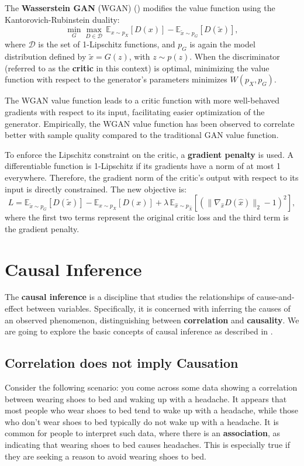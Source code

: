 The \textbf{Wasserstein GAN} (WGAN) (\cite{gulrajani2017}) modifies the value
function using the Kantorovich-Rubinstein duality:
\[
\min_G \max_{D \in \mathcal{D}} \, \mathbb{E}_{x \sim p_X}[D(x)] - \mathbb{E}_{\tilde{x} \sim p_G}[D(\tilde{x})],
\]
where \( \mathcal{D} \) is the set of 1-Lipschitz functions,
and \( p_G \) is again the model distribution defined by \(\tilde{x} = G(z)\),
with \( z \sim p(z) \). When the discriminator (referred to as the \textbf{critic}
in this context) is optimal, minimizing the value function with respect
to the generator's parameters minimizes \( W(p_X, p_G) \).

The WGAN value function leads to a critic function with more well-behaved
gradients with respect to its input, facilitating easier optimization
of the generator. Empirically, the WGAN value function has been observed
to correlate better with sample quality compared to the traditional GAN value
function.

To enforce the Lipschitz constraint on the critic, a \textbf{gradient penalty}
is used.
A differentiable function is 1-Lipschitz if its gradients have a norm of at most
1 everywhere. Therefore, the gradient norm of the critic's output with respect
to its input is directly constrained. The new objective is:
\[
L = \mathbb{E}_{\tilde{x} \sim p_G}[D(\tilde{x})] - \mathbb{E}_{x \sim p_X}[D(x)] + \lambda \, \mathbb{E}_{\hat{x} \sim p_{\hat{X}}}[(\|\nabla_{\hat{x}} D(\hat{x})\|_2 - 1)^2],
\]
where the first two terms represent the original critic loss and the
third term is the gradient penalty.

\section{Causal Inference}

The \textbf{causal inference} is a discipline that studies the relationships
of cause-and-effect between variables. Specifically, it is concerned with inferring
the causes of an observed phenomenon,
distinguishing between \textbf{correlation} and \textbf{causality}.
We are going to explore the basic concepts of causal inference
as described in \cite{Neal_2020a}.

\subsection{Correlation does not imply Causation}
\label{sec:correlation}

Consider the following scenario: you come across some data showing a correlation
between wearing shoes to bed and waking up with a headache.
It appears that most people who wear shoes to bed tend to wake up
with a headache, while those who don’t wear shoes to bed typically
do not wake up with a headache.
It is common for people to interpret such data,
where there is an \textbf{association},
as indicating that wearing shoes
to bed causes headaches. This is especially true if they are
seeking a reason to avoid wearing shoes to bed.

